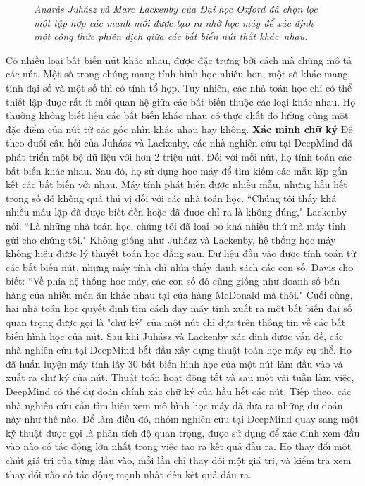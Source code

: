 \begin{multicols}{2}
\begin{figure}[H]
		\caption{\small\textit{\color{duongvaotoanhoc}András Juhász và Marc Lackenby của Đại học Oxford đã chọn lọc  một tập hợp các manh mối được tạo ra nhờ học máy để xác định một công thức phiên dịch giữa các bất biến nút thắt khác~nhau.}}
		\vspace*{-10pt}
	\end{figure}
	Có nhiều loại bất biến nút khác nhau, được đặc trưng bởi cách mà chúng mô tả các nút. Một số trong chúng mang tính hình học nhiều hơn, một số khác mang tính đại số và một số thì có tính tổ hợp. Tuy nhiên, các nhà toán học chỉ có thể thiết lập được rất ít mối quan hệ giữa các bất biến thuộc các loại khác nhau. Họ thường không biết liệu các bất biến khác nhau có thực chất đo lường cùng một đặc điểm của nút từ các góc nhìn khác nhau hay không.
	\vskip 0.05cm
	\textbf{\color{duongvaotoanhoc}Xác minh chữ ký}
	\vskip 0.05cm
	Để theo đuổi câu hỏi của Juhász và Lackenby, các nhà nghiên cứu tại DeepMind đã phát triển một bộ dữ liệu với hơn 2 triệu nút. Đối với mỗi nút, họ tính toán các bất biến khác nhau. Sau đó, họ sử dụng học máy để tìm kiếm các mẫu lặp gắn kết các bất biến với nhau. Máy tính phát hiện được nhiều mẫu, nhưng hầu hết trong số đó không quá thú vị đối với các nhà toán học.
	\vskip 0.05cm
	``Chúng tôi thấy khá nhiều mẫu lặp đã được biết đến hoặc đã được chỉ ra là không đúng," Lackenby nói. ``Là những nhà toán học, chúng tôi đã loại bỏ khá nhiều thứ mà máy tính gửi cho chúng tôi."
	\vskip 0.05cm
	Không giống như Juhász và Lackenby, hệ thống học máy không hiểu được lý thuyết toán học đằng sau. Dữ liệu đầu vào được tính toán từ các bất biến nút, nhưng máy tính chỉ nhìn thấy danh sách các con số.
	\vskip 0.05cm
	Davis cho biết: ``Về phía hệ thống học máy, các con số đó cũng giống như doanh số bán hàng của nhiều món ăn khác nhau tại cửa hàng McDonald mà thôi."
	\vskip 0.05cm
	Cuối cùng, hai nhà toán học quyết định tìm cách dạy máy tính xuất ra một bất biến đại số quan trọng được gọi là "chữ ký" của một nút chỉ dựa trên thông tin về các bất biến hình học của nút.
	\vskip 0.05cm
	Sau khi Juhász và Lackenby xác định được vấn đề, các nhà nghiên cứu tại DeepMind bắt đầu xây dựng thuật toán học máy cụ thể. Họ đã huấn luyện máy tính lấy $30$ bất biến hình học của một nút làm đầu vào và xuất ra chữ ký của nút. Thuật toán hoạt động tốt và sau một vài tuần làm việc, DeepMind có thể dự đoán chính xác chữ ký của hầu hết các nút.
	\vskip 0.05cm
	Tiếp theo, các nhà nghiên cứu cần tìm hiểu xem mô hình học máy đã đưa ra những dự đoán này như thế nào. Để làm điều đó, nhóm nghiên cứu tại DeepMind quay sang một kỹ thuật được gọi là phân tích độ quan trọng, được sử dụng để xác định xem đầu vào nào có tác động lớn nhất trong việc tạo ra kết quả đầu ra. Họ thay đổi một chút giá trị của từng đầu vào, mỗi lần chỉ thay đổi một giá trị, và kiểm tra xem thay đổi nào có tác động mạnh nhất đến kết quả đầu ra.

\end{multicols}

